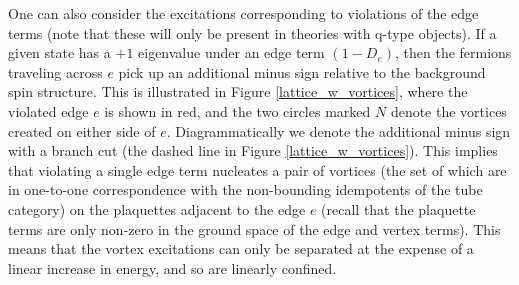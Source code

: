 One can also consider the excitations corresponding to violations of the edge terms 
(note that these will only be present in theories with q-type objects).
If a given state has a $+1$ eigenvalue under an edge term $(1-D_e)$, 
then the fermions traveling across $e$ pick up an additional minus sign relative to the background spin structure.
This is illustrated in Figure \ref{lattice_w_vortices}, where the violated edge $e$ is shown in red, and the two circles marked $N$ denote the vortices created on either side of $e$. 
Diagrammatically we denote the additional minus sign with a branch cut (the dashed line in Figure \ref{lattice_w_vortices}).
This implies that violating a single edge term nucleates a pair of vortices (the set of which are in one-to-one correspondence with the non-bounding idempotents of the tube category) on the plaquettes adjacent to the edge $e$ (recall that the plaquette terms are only non-zero in the ground space of the edge and vertex terms).
This means that the vortex excitations can only be separated
at the expense of a linear increase in energy, and so are linearly confined. 


